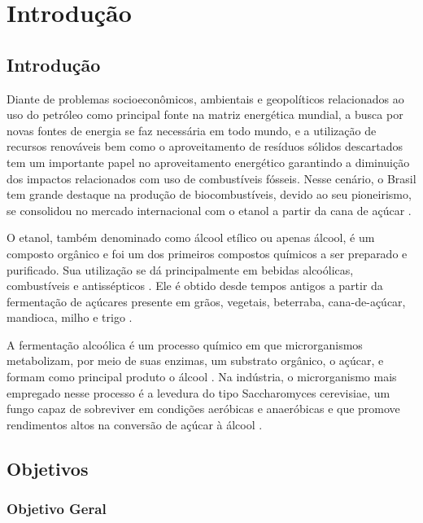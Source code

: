 \chapter[Introdução]{Introdução}

\section{Introdução}

Diante de problemas socioeconômicos, ambientais e geopolíticos relacionados ao uso do petróleo como principal fonte na matriz energética mundial, a busca por novas fontes de energia se faz necessária em todo mundo, e a utilização de recursos renováveis bem como o aproveitamento de resíduos sólidos descartados tem um importante papel no aproveitamento energético garantindo a diminuição dos impactos relacionados com uso de combustíveis fósseis. Nesse cenário, o Brasil tem grande destaque na produção de biocombustíveis, devido ao seu pioneirismo, se consolidou no mercado internacional com o etanol a partir da cana de açúcar \cite{santos2013bioenergia}.

O etanol, também denominado como álcool etílico ou apenas álcool, é um composto orgânico e foi um dos primeiros compostos químicos a ser preparado e purificado. Sua utilização se dá principalmente em bebidas alcoólicas, combustíveis e antissépticos \cite{de2004introduccao}. Ele é obtido desde tempos antigos a partir da fermentação de açúcares presente em grãos, vegetais, beterraba, cana-de-açúcar, mandioca, milho e trigo \cite{santos2013bioenergia}.

A fermentação alcoólica é um processo químico em que microrganismos metabolizam, por meio de suas enzimas, um substrato orgânico, o açúcar, e formam como principal produto o álcool \cite{furlan2009produccao}. Na indústria, o microrganismo mais empregado nesse processo é a levedura do tipo Saccharomyces cerevisiae, um fungo capaz de sobreviver em condições aeróbicas e anaeróbicas e que promove rendimentos altos na conversão de açúcar à álcool \cite{lima2001biotecnologia}.

\section{Objetivos}

\subsection{Objetivo Geral}

